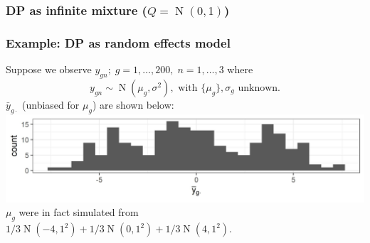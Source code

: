\documentclass{beamer}
\newcommand{\op}{\operatorname}
\begin{document}
\begin{frame}%
\frametitle{DP as infinite mixture ($Q=\op{N}(0,1)$)}
\end{frame}

\begin{frame}%
\frametitle{Example: DP as random effects model}
{\small Suppose we observe $y_{gn};\; g=1,\ldots,200,\; n=1,\ldots,3$ where\\
    \pause\[ y_{gn} \sim \op{N}(\mu_g,\sigma^2),\mbox{ with }\{\mu_g\},\sigma_g\mbox{ unknown.}\]
 \pause $\bar{y}_{g\cdot}$ (unbiased for $\mu_g$) are shown below:\\
 {\centering \includegraphics[width=.9\textwidth]{samplemeans_ie}}\\

\pause $\mu_g$ were in fact simulated from $1/3\op{N}(-4,1^2) + 1/3\op{N}(0,1^2) + 1/3\op{N}(4,1^2)$.
}
\end{frame}
\end{document}

